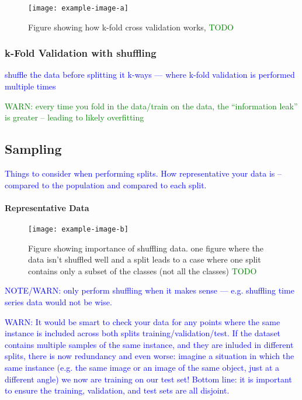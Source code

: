 
\begin{figure}[htp]
	\centering
	\texttt{[image: example-image-a]}\hfil
	\caption{Figure showing how k-fold cross validation works, \textcolor{green}{TODO}}
	\label{fig:sample_split_k_fold}
\end{figure}

\subsubsection{k-Fold Validation with shuffling}

\textcolor{blue}{shuffle the data before splitting it k-ways --- where k-fold validation is performed multiple times}

\textcolor{green}{WARN: every time you fold in the data/train on the data, the ``information leak'' is greater -- leading to likely overfitting}

\subsection{Sampling}

\textcolor{blue}{Things to consider when performing splits. How representative your data is -- compared to the population and compared to each split.}

\paragraph{Representative Data}

\begin{figure}[htp]
	\centering
	\texttt{[image: example-image-b]}\hfil
	\caption{Figure showing importance of shuffling data. one figure where the data isn't shuffled well and a split leads to a case where one split contains only a subset of the classes (not all the classes) \textcolor{green}{TODO}}
	\label{fig:sample_split_shuffle_importance}
\end{figure}

\textcolor{blue}{NOTE/WARN: only perform shuffling when it makes sense --- e.g. shuffling time series data would not be wise.}

\textcolor{blue}{WARN: It would be smart to check your data for any points where the same instance is included across both splits training/validation/test. If the dataset contains multiple samples of the same instance, and they are inluded in different splits, there is now redundancy and even worse: imagine a situation in which the same instance (e.g. the same image or an image of the same object, just at a different angle) we now are training on our test set!  Bottom line: it is important to ensure the training, validation, and test sets are all disjoint.}

